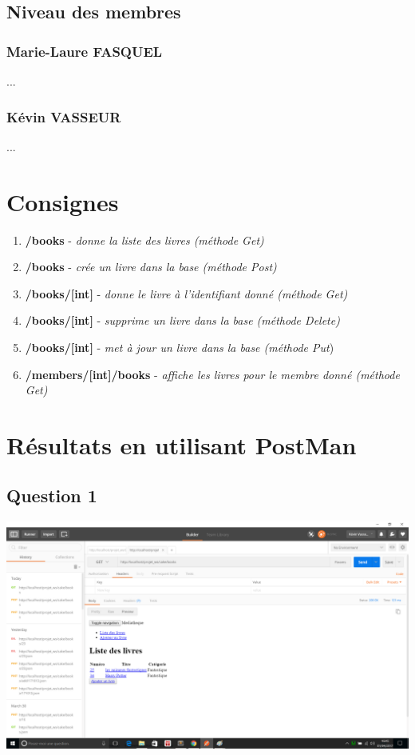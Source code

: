 \documentclass{report}
\begin{document}
		\subsection{Niveau des membres}
			\subsubsection{Marie-Laure FASQUEL}
			...
			\subsubsection{K\'{e}vin VASSEUR}
			...
			
	\section{Consignes}
	\begin{enumerate}
		\item \textbf{/books} - \textit{donne la liste des livres (m\'{e}thode Get)}
		\item \textbf{/books} - \textit{cr\'{e}e un livre dans la base (m\'{e}thode Post)}
		\item \textbf{/books/[int]} - \textit{donne le livre \`{a} l'identifiant donn\'{e} (m\'{e}thode Get)} 
		\item \textbf{/books/[int]} - \textit{supprime un livre dans la base (m\'{e}thode Delete)} 
		\item \textbf{/books/[int]} - \textit{met \`{a} jour un livre dans la base (m\'{e}thode Put}) 
		\item \textbf{/members/[int]/books} - \textit{affiche les livres pour le membre donn\'{e} (m\'{e}thode Get)} 
	\end{enumerate}
	
	
	\section{R\'{e}sultats en utilisant PostMan}
		\subsection{Question 1}
		\begin{center}
			\includegraphics[scale=0.4]{resultats/q1.png} 
		\end{center} 
\end{document}
